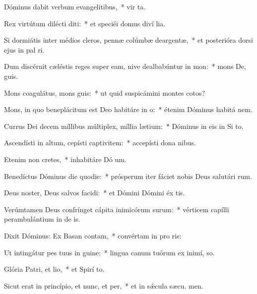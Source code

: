 \item Dóminus dabit verbum evangelitibus,~* vir ta.
\item Rex virtútum dilécti diti:~* et speciéi domus diví lia.
\item Si dormiátis inter médios cleros, pennæ colúmbæ deargentæ,~* et posterióra dorsi ejus in pal ri.
\item Dum discérnit cæléstis reges super eam, nive dealbabúntur in mon:~* mons De,  guis.
\item Mons coagulátus, mons guis:~* ut quid suspicámini montes cotos?
\item Mons, in quo beneplácitum est Deo habitáre in o:~* étenim Dóminus habitá  nem.
\item Currus Dei decem míllibus múltiplex, míllia lætium:~* Dóminus in eis in Si  to.
\item Ascendísti in altum, cepísti captivitem:~* accepísti dona  nibus.
\item Etenim non cretes,~* inhabitáre Dó um.
\item Benedíctus Dóminus die quodie:~* prósperum iter fáciet nobis Deus salutári rum.
\item Deus noster, Deus salvos facidi:~* et Dómini Dómini éx tis.
\item Verúmtamen Deus confrínget cápita inimicórum surum:~* vérticem capílli perambulántium in de is.
\item Dixit Dóminus: Ex Basan contam,~* convértam in pro ris:
\item Ut intingátur pes tuus in guine:~* lingua canum tuórum ex inimí,  so.
\item Glória Patri, et lio,~* et Spirí to.
\item Sicut erat in princípio, et nunc, et per,~* et in sǽcula sæcu. men.
